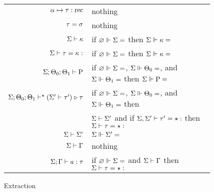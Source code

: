 \documentclass{article}
\begin{document}
\begin{figure}
\begin{center}
\begin{tabular}{r@{$\;\;\mapsto\;\;$}l}
$\alpha \mapsto \tau : \mathrm{rec}$ & nothing \\
$\tau = \sigma$ & nothing \\
$\Sigma \vdash \kappa$ & if $\varnothing \Vdash \Sigma =$ then $\Sigma \Vdash \kappa =$ \\
$\Sigma \vdash \tau = \kappa :$ & if $\varnothing \Vdash \Sigma =$ then $\Sigma \Vdash \kappa =$ \\
$\Sigma ; \Theta_0 ; \Theta_1 \vdash \mathrm{P}$ &
  if $\varnothing \Vdash \Sigma =$, $\Sigma \Vdash \Theta_0 =$, and $\Sigma \Vdash \Theta_1 =$ then $\Sigma \Vdash \mathrm{P} =$ \\
$\Sigma ; \Theta_0 ; \Theta_1 \vdash^\star (\Sigma' \vdash \tau') \mathrel\triangleright \tau$ &
  if $\varnothing \Vdash \Sigma =$, $\Sigma \Vdash \Theta_0 =$, and $\Sigma \Vdash \Theta_1 =$ then \\
  & $\Sigma \vdash \Sigma'$ and
  if $\Sigma, \Sigma' \vdash \tau' = \star :$ then $\Sigma \vdash \tau = \star :$ \\
$\Sigma \vdash \Sigma'$ & $\Sigma \Vdash \Sigma' =$ \\
$\Sigma \vdash \Gamma$ & nothing \\
$\Sigma ; \Gamma \vdash a : \tau$ & if $\varnothing \Vdash \Sigma =$ and $\Sigma \vdash \Gamma$ then $\Sigma \vdash \tau = \star :$ \\
\end{tabular}
\end{center}
\caption{Extraction}
\label{fig:extraction}
\end{figure}
\end{document}
